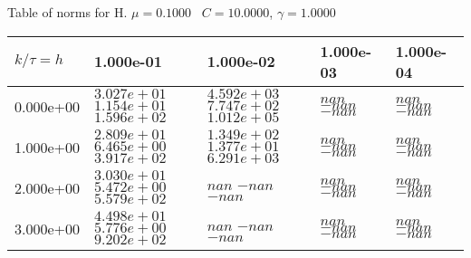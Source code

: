 \begin{center}
Table of norms for H. $\mu = 0.1000$ \, $C = 10.0000$, $\gamma = 1.0000$
  
\begin{tabular}{|p{1in}|p{1in}|p{1in}|p{1in}|p{1in}|} \hline
$k / \tau = h$ &1.000e-01 &1.000e-02 &1.000e-03 &1.000e-04 \\ \hline 
0.000e+00 & $3.027e+01$  $1.154e+01$  $1.596e+02$  & $4.592e+03$  $7.747e+02$  $1.012e+05$  & $nan$  $-nan$  $-nan$  & $nan$  $-nan$  $-nan$  \\ \hline 
1.000e+00 & $2.809e+01$  $6.465e+00$  $3.917e+02$  & $1.349e+02$  $1.377e+01$  $6.291e+03$  & $nan$  $-nan$  $-nan$  & $nan$  $-nan$  $-nan$  \\ \hline 
2.000e+00 & $3.030e+01$  $5.472e+00$  $5.579e+02$  & $nan$  $-nan$  $-nan$  & $nan$  $-nan$  $-nan$  & $nan$  $-nan$  $-nan$  \\ \hline 
3.000e+00 & $4.498e+01$  $5.776e+00$  $9.202e+02$  & $nan$  $-nan$  $-nan$  & $nan$  $-nan$  $-nan$  & $nan$  $-nan$  $-nan$  \\ \hline 

\end{tabular}\\[20pt]
\end{center}
